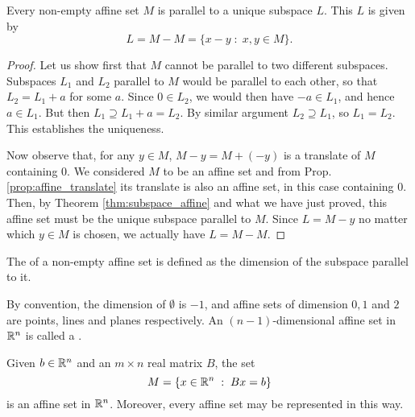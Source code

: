 \documentclass[11pt,a4paper]{article}
\begin{document}

\begin{theorem}\label{thm:unique_subspace_parallel_to_affine}
    Every non-empty affine set $M$ is parallel to a unique subspace $L$. This $L$ is given by
    \begin{equation*}
        L = M - M = \{x - y\;:\; x,y\in M\}.
    \end{equation*}
\end{theorem}

\begin{proof}
    Let us show first that $M$ cannot be parallel to two different subspaces. Subspaces $L_1$ and $L_2$ parallel to $M$ would be parallel to each other, so that $L_2 = L_1 + a$ for some $a$. Since $0\in L_2$, we would then have $-a\in L_1$, and hence $a\in L_1$. But then $L_1 \supseteq L_1 + a = L_2$. By similar argument $L_2\supseteq L_1$, so $L_1 = L_2$. This establishes the uniqueness. 
    
    Now observe that, for any $y\in M$, $M-y = M+(-y)$ is a translate of $M$ containing $0$. We considered $M$ to be an affine set and from Prop. \ref{prop:affine_translate} its translate is also an affine set, in this case containing $0$. Then, by Theorem \ref{thm:subspace_affine} and what we have just proved, this affine set must be the unique subspace parallel to $M$. Since $L = M-y$ no matter which $y\in M$ is chosen, we actually have $L = M - M$.  
\end{proof}

\begin{definition}
    The  of a non-empty affine set is defined as the dimension of the subspace parallel to it.
\end{definition}

By convention, the dimension of $\emptyset$ is $-1$, and affine sets of dimension $0, 1$ and $2$ are points, lines and planes respectively. An $(n-1)$-dimensional affine set in $\mathbb{R}^n$ is called a .

\begin{theorem}\label{thm:affine_set_representation}
    Given $b\in\mathbb{R}^n$ and an $m\times n$ real matrix $B$, the set
    \begin{equation*}
        M = \{x\in \mathbb{R}^n\;:\; Bx = b\}
    \end{equation*}
    is an affine set in $\mathbb{R}^n$. Moreover, every affine set may be represented in this way.
\end{theorem}
\end{document}
